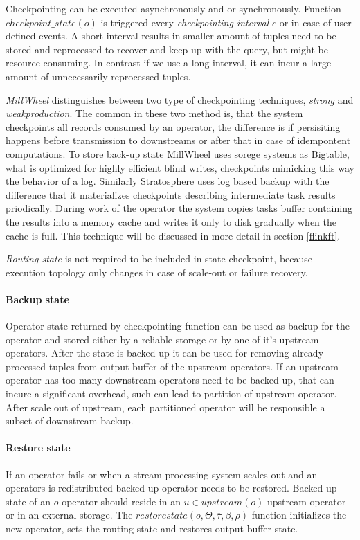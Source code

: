 Checkpointing can be executed asynchronously and or synchronously. %
Function $checkpoint\_state(o)$ is triggered every \textit{checkpointing interval} $c$ or in case of user defined events. A short interval results in smaller amount of tuples need to be stored and reprocessed to recover and keep up with the query, but might be resource-consuming. In contrast if we use a long interval, it can incur a large amount of unnecessarily reprocessed tuples. 

\textit{MillWheel} %
distinguishes between two type of checkpointing techniques, \textit{strong} and \textit{weakproduction}. The common in these two method is, that the system checkpoints all records consumed by an operator, the difference is if persisiting happens before transmission to downstreams or after that in case of idempontent computations. To store back-up state MillWheel uses sorege systems as Bigtable\cite{bigtable}, what is optimized for highly efficient blind writes, checkpoints mimicking this way the behavior of a log.
Similarly Stratosphere uses log based backup with the difference that it  materializes checkpoints describing intermediate task results priodically. During work of the operator the system copies tasks buffer containing the results into a memory cache and writes it only to disk gradually when the cache is full. This technique will be discussed in more detail in section \ref{flinkft}. 

\textit{Routing state} is not required to be included in state checkpoint, because execution topology only changes in case of scale-out or failure recovery.

\paragraph{Backup state}
Operator state returned by checkpointing function can be used as backup for the operator and stored either by a reliable storage or by one of it's upstream operators. After the state is backed up it can be used for removing already processed tuples from output buffer of the upstream operators. If an upstream operator has too many downstream operators need to be backed up, that can incure a significant overhead, such can lead to partition of upstream operator. After scale out of upstream, each partitioned operator will be responsible a subset of downstream backup. 


\paragraph{Restore state}
If an operator fails or when a stream processing system scales out and an operators is redistributed backed up operator needs to be restored. Backed up state of an $o$ operator should reside in an $u \in upstream(o)$ upstream operator or in an external storage.  The $restorestate(o,\Theta,\overline{\tau},\beta,\rho)$ function initializes the new operator, sets the routing state and restores output buffer state.

